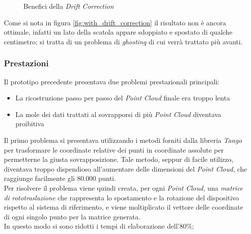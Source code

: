 \begin{figure}[htp] 
    \centering
    \hfill%
    \caption{Benefici della \emph{Drift Correction}}
\end{figure}
\newline
Come si nota in figura \ref{fig:with_drift_correction} il risultato non è ancora ottimale, infatti un lato della scatola appare sdoppiato e spostato di qualche centimetro; si tratta di un problema di \emph{ghosting} di cui verrà trattato più avanti.

\subsubsection{Prestazioni}
Il prototipo precedente presentava due problemi prestazionali principali:
\begin{itemize}
\item La ricostruzione passo per passo del \emph{Point Cloud} finale era troppo lenta
\item La mole dei dati trattati al sovrapporsi di più \emph{Point Cloud} diventava proibitiva
\end{itemize}
\noindent
Il primo problema si presentava utilizzando i metodi forniti dalla libreria \emph{Tango} per trasformare le coordinate relative dei punti in coordinate assolute per permetterne la giusta sovrapposizione. Tale metodo, seppur di facile utilizzo, diventava troppo dispendioso all'aumentare delle dimensioni del \emph{Point Cloud}, che raggiunge facilmente gli 80.000 punti.\\
Per risolvere il problema viene quindi creata, per ogni \emph{Point Cloud}, una \emph{matrice di rototraslazione} che rappresenta lo spostamento e la rotazione del dispositivo rispetto al sistema di riferimento, e viene moltiplicato il vettore delle coordinate di ogni singolo punto per la matrice generata. \\
In questo modo si sono ridotti i tempi di elaborazione dell'80\%;
\newline

